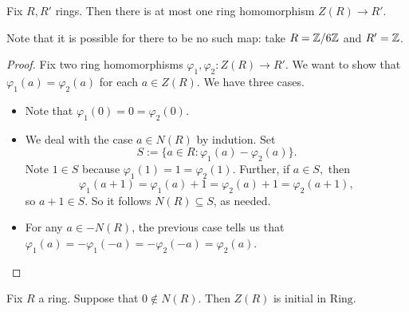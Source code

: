 \documentclass{article}
\begin{document}
\begin{lemma} \label{lem:atmostone}
	Fix $R,R'$ rings. Then there is at most one ring homomorphism $Z(R)\to R'.$
\end{lemma}
Note that it is possible for there to be no such map: take $R=\mathbb Z/6\mathbb Z$ and $R'=\mathbb Z$.
\begin{proof}
	Fix two ring homomorphisms $\varphi_1,\varphi_2:Z(R)\to R'.$ We want to show that $\varphi_1(a)=\varphi_2(a)$ for each $a\in Z(R).$ We have three cases.
	\begin{itemize}
		\item Note that $\varphi_1(0)=0=\varphi_2(0)$.
		\item We deal with the case $a\in N(R)$ by indution. Set
		\[S:=\{a\in R:\varphi_1(a)-\varphi_2(a)\}.\]
		Note $1\in S$ because $\varphi_1(1)=1=\varphi_2(1).$ Further, if $a\in S,$ then
		\[\varphi_1(a+1)=\varphi_1(a)+1=\varphi_2(a)+1=\varphi_2(a+1),\]
		so $a+1\in S$. So it follows $N(R)\subseteq S$, as needed.
		\item For any $a\in-N(R)$, the previous case tells us that $\varphi_1(a)=-\varphi_1(-a)=-\varphi_2(-a)=\varphi_2(a)$.
		\qedhere
	\end{itemize}
\end{proof}
\begin{proposition} \label{prop:trichimpliesinitial}
	Fix $R$ a ring. Suppose that $0\notin N(R)$. Then $Z(R)$ is initial in $\mathrm{Ring}$.
\end{proposition}
\end{document}
